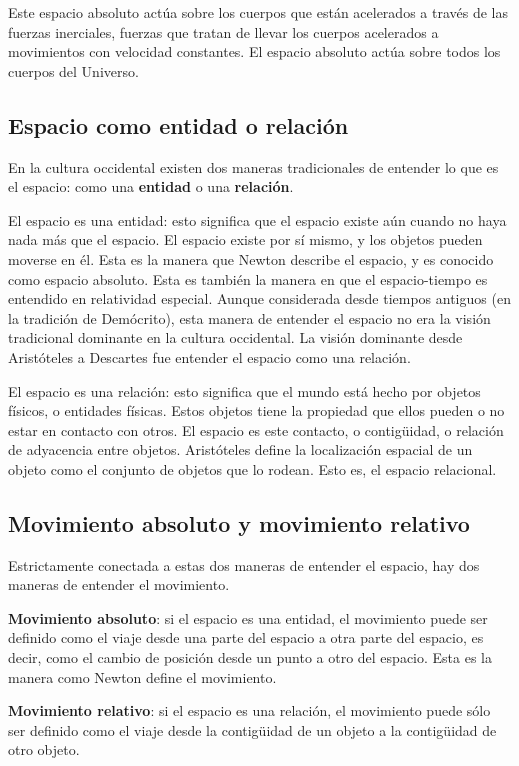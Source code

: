 \documentclass[../apunte_mecanica_clasica.tex]{subfiles}%
\begin{document}
Este espacio absoluto actúa sobre los cuerpos que están acelerados a través de las fuerzas inerciales, fuerzas que tratan de llevar los cuerpos acelerados a movimientos con velocidad constantes. El espacio absoluto actúa sobre todos los cuerpos del Universo.

\subsection{Espacio como entidad o relación}

En la cultura occidental existen dos maneras tradicionales de entender lo que es el espacio: como una \textbf{entidad} o una \textbf{relación}.

El espacio es una entidad: esto significa que el espacio existe aún cuando no haya nada más que el espacio. El espacio existe por sí mismo, y los objetos pueden moverse en él. Esta es la manera que Newton describe el espacio, y es conocido como espacio absoluto. Esta es también la manera en que el espacio-tiempo es entendido en relatividad especial. Aunque considerada desde tiempos antiguos (en la tradición de Demócrito), esta manera de entender el espacio no era la visión tradicional dominante en la cultura occidental. La visión dominante desde Aristóteles a Descartes fue entender el espacio como una relación.

El espacio es una relación: esto significa que el mundo está hecho por objetos físicos, o entidades físicas. Estos objetos tiene la propiedad que ellos pueden o no estar en contacto con otros. El espacio es este contacto, o contigüidad, o relación de adyacencia entre objetos. Aristóteles define la localización espacial de un objeto como el conjunto de objetos que lo rodean. Esto es, el espacio relacional.

\subsection{Movimiento absoluto y movimiento relativo}

Estrictamente conectada a estas dos maneras de entender el espacio, hay dos maneras de entender el movimiento.

\textbf{Movimiento absoluto}: si el espacio es una entidad, el movimiento puede ser definido como el viaje desde una parte del espacio a otra parte del espacio, es decir, como el cambio de posición desde un punto a otro del espacio. Esta es la manera como Newton define el movimiento.

\textbf{Movimiento relativo}: si el espacio es una relación, el movimiento puede sólo ser definido como el viaje desde la contigüidad de un objeto a la contigüidad de otro objeto.
\end{document}
